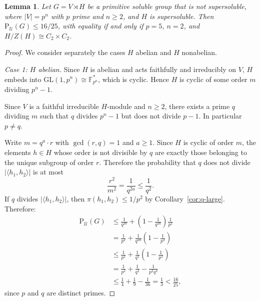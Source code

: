 \documentclass[10pt,a4paper]{amsart}
\newtheorem{lemma}{Lemma}
\newcommand{\Psu}{\mathrm{P}_{\mathcal{U}}}
\begin{document}
	\begin{lemma}\label{lem:primitive}
		Let $G = V \rtimes H$ be a primitive soluble group that is 
		not supersoluble, where $|V| = p^n$ with $p$ prime and 
		$n \geq 2$, and $H$ is supersoluble. Then 
		$\Psu(G) \leq 16/25$, with equality if and only if $p = 5$, 
		$n=2$, and $H/Z(H) \cong C_2 \times C_2$.
	\end{lemma}
	\begin{proof}
		We consider separately the cases $H$ abelian and $H$ nonabelian.
		
		\medskip
		
		\noindent\textit{Case 1: $H$ abelian.}
		Since $H$ is abelian and acts faithfully and irreducibly on $V$, 
		$H$ embeds into $\mathrm{GL}(1,p^n) \cong \mathbb{F}_{p^n}^*$, 
		which is cyclic. Hence $H$ is cyclic of some order $m$ dividing 
		$p^n - 1$.
		
		Since $V$ is a faithful irreducible $H$-module and $n \geq 2$, 
		there exists a prime $q$ dividing $m$ such that $q$ divides 
		$p^n-1$ but does not divide $p-1$. In particular $p \neq q$.
		
		Write $m = q^a \cdot r$ with $\gcd(r,q) = 1$ and $a \geq 1$. 
		Since $H$ is cyclic of order $m$, the elements $h \in H$ whose 
		order is not divisible by $q$ are exactly those belonging to 
		the unique subgroup of order $r$. Therefore the probability 
		that $q$ does not divide $|\langle h_1,h_2\rangle|$ is at most
		$$\frac{r^2}{m^2} = \frac{1}{q^{2a}} \leq \frac{1}{q^2}.$$
		If $q$ divides $|\langle h_1,h_2\rangle|$, then %
		$\pi(h_1,h_2) \leq 1/p^2$ by Corollary~\ref{cor:q-large}. 
		Therefore:
		\begin{align*}
			\Psu(G) &\leq \frac{1}{q^{2a}} + 
			\left(1-\frac{1}{q^{2a}}\right)\frac{1}{p^2}\\
			&= \frac{1}{p^2} + \frac{1}{q^{2a}}\left(1-\frac{1}{p^2}\right)\\
			&\leq \frac{1}{p^2}+\frac{1}{q^2}\left(1-\frac{1}{p^2}\right)\\
			&= \frac{1}{p^2}+\frac{1}{q^2}-\frac{1}{p^2q^2}\\
			&\leq \frac{1}{4}+\frac{1}{9}-\frac{1}{36}
			= \frac{1}{3} < \frac{16}{25},
		\end{align*}
		since $p$ and $q$ are distinct primes.
		
		
	

\end{proof}
\end{document}
